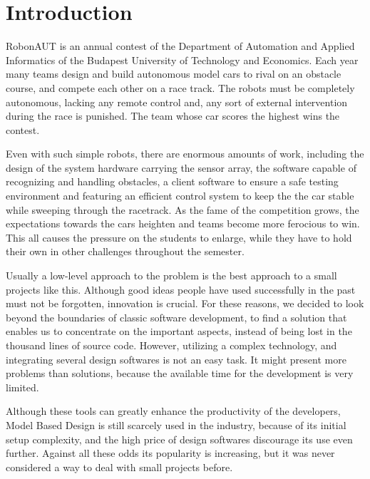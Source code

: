\section{Introduction}
\label{sec:Introduction}


RobonAUT is an annual contest of the Department of Automation and Applied Informatics of the Budapest University of Technology and Economics. Each year many teams design and build autonomous model cars to rival on an obstacle course, and compete each other on a race track. The robots must be completely autonomous, lacking any remote control and, any sort of external intervention during the race is punished. The team whose car scores the highest wins the contest\cite{rules}.


Even with such simple robots, there are enormous amounts of work, including the design of the system hardware carrying the sensor array, the software capable of recognizing and handling obstacles, a client software to ensure a safe testing environment and featuring an efficient control system to keep the the car stable while sweeping through the racetrack\cite{robonaut_tdk}. As the fame of the competition grows, the expectations towards the cars heighten and teams become more ferocious to win. This all causes the pressure on the students to enlarge, while they have to hold their own in other challenges throughout the semester.


Usually a low-level approach to the problem is the best approach to a small projects like this. Although good ideas people have used successfully in the past must not be forgotten, innovation is crucial. For these reasons, we decided to look beyond the boundaries of classic software development, to find a solution that enables us to concentrate on the important aspects, instead of being lost in the thousand lines of source code. However, utilizing a complex technology, and integrating several design softwares is not an easy task. It might present more problems than solutions, because the available time for the development is very limited.


Although these tools can greatly enhance the productivity of the developers, Model Based Design is still scarcely used in the industry, because of its initial setup complexity, and the high price of design softwares discourage its use even further. Against all these odds its popularity is increasing, but it was never considered a way to deal with small projects before.

